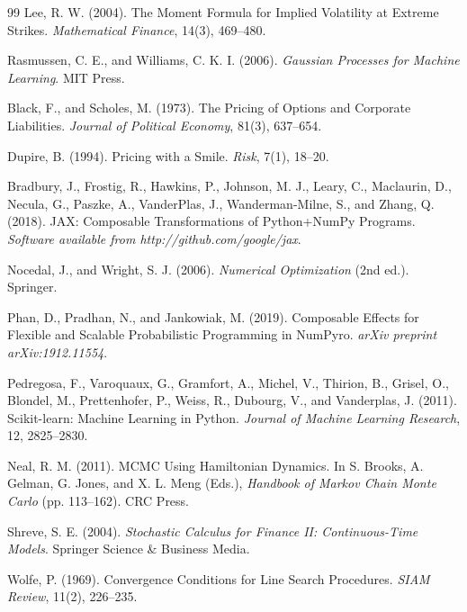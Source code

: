 \documentclass[12pt,oneside]{report}
\theoremstyle{definition}
\theoremstyle{remark}
\begin{document}
\begin{thebibliography}{99}
Lee, R. W. (2004).
The Moment Formula for Implied Volatility at Extreme Strikes.
\textit{Mathematical Finance}, 14(3), 469--480.

Rasmussen, C. E., and Williams, C. K. I. (2006).
\textit{Gaussian Processes for Machine Learning}.
MIT Press.

Black, F., and Scholes, M. (1973).
The Pricing of Options and Corporate Liabilities.
\textit{Journal of Political Economy}, 81(3), 637--654.

Dupire, B. (1994).
Pricing with a Smile.
\textit{Risk}, 7(1), 18--20.

Bradbury, J., Frostig, R., Hawkins, P., Johnson, M. J., Leary, C., Maclaurin, D., Necula, G., Paszke, A., VanderPlas, J., Wanderman-Milne, S., and Zhang, Q. (2018).
{JAX}: Composable Transformations of {Python}+{NumPy} Programs.
\textit{Software available from http://github.com/google/jax}.

Nocedal, J., and Wright, S. J. (2006).
\textit{Numerical Optimization} (2nd ed.).
Springer.

Phan, D., Pradhan, N., and Jankowiak, M. (2019).
Composable Effects for Flexible and Scalable Probabilistic Programming in {NumPyro}.
\textit{arXiv preprint arXiv:1912.11554}.

Pedregosa, F., Varoquaux, G., Gramfort, A., Michel, V., Thirion, B., Grisel, O., Blondel, M., Prettenhofer, P., Weiss, R., Dubourg, V., and Vanderplas, J. (2011).
Scikit-learn: Machine Learning in {Python}.
\textit{Journal of Machine Learning Research}, 12, 2825--2830.

Neal, R. M. (2011).
{MCMC} Using Hamiltonian Dynamics.
In S. Brooks, A. Gelman, G. Jones, and X. L. Meng (Eds.), \textit{Handbook of Markov Chain Monte Carlo} (pp. 113--162). CRC Press.

Shreve, S. E. (2004).
\textit{Stochastic Calculus for Finance II: Continuous-Time Models}.
Springer Science \& Business Media.

Wolfe, P. (1969).
Convergence Conditions for Line Search Procedures.
\textit{SIAM Review}, 11(2), 226--235.


\end{thebibliography}
\end{document}
